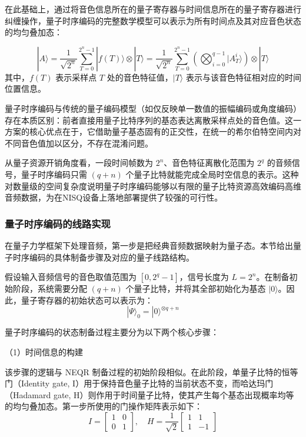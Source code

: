 在此基础上，通过将音色信息所在的量子寄存器与时间信息所在的量子寄存器进行纠缠操作，量子时序编码的完整数学模型可以表示为所有时间点及其对应音色状态的均匀叠加态：

\begin{equation}
    |A\rangle = \frac{1}{\sqrt{2^n}} \sum_{T=0}^{2^n-1} |f(T)\rangle \otimes |T\rangle = \frac{1}{\sqrt{2^n}} \sum_{T=0}^{2^n-1} \left( \bigotimes_{i=0}^{q-1} |A_{T}^{i}\rangle \right) \otimes |T\rangle
    \label{eq:qtse_state}
\end{equation}
其中，$f(T)$ 表示采样点 $T$ 处的音色特征值，$|T\rangle$ 表示与该音色特征相对应的时间位置信息。

量子时序编码与传统的量子编码模型（如仅反映单一数值的振幅编码或角度编码）存在本质区别：前者直接用量子比特序列的基态表达离散采样点处的音色值。这一方案的核心优点在于，它借助量子基态固有的正交性，在统一的希尔伯特空间内对不同音色值加以区分，不存在混淆问题。

从量子资源开销角度看，一段时间帧数为 $2^n$、音色特征离散化范围为 $2^q$ 的音频信号，量子时序编码只需 $(q+n)$ 个量子比特就能完成全局时空信息的表示。这种对数量级的空间复杂度说明量子时序编码能够以有限的量子比特资源高效编码高维音频数据，为在NISQ设备上落地部署提供了较强的可行性。

\subsubsection{量子时序编码的线路实现}
\label{sec:qtse_circuit}

在量子力学框架下处理音频，第一步是把经典音频数据映射为量子态。本节给出量子时序编码的具体制备步骤及对应的量子线路结构。

假设输入音频信号的音色取值范围为 $\left[0, 2^{q} - 1\right]$，信号长度为 $L = 2^n$。在制备初始阶段，系统需要分配 $(q+n)$ 个量子比特，并将其全部初始化为基态 $|0\rangle$。因此，量子寄存器的初始状态可以表示为：
\begin{equation}
	|\Psi\rangle_0=|0\rangle^{\otimes q+n}
	\label{eq:initial_state}
\end{equation}

量子时序编码的状态制备过程主要分为以下两个核心步骤：

（1）时间信息的构建

该步骤的逻辑与 NEQR 制备过程的初始阶段相似。在此阶段，单量子比特的恒等门（Identity gate, I）用于保持音色量子比特的当前状态不变，而哈达玛门（Hadamard gate, H）则作用于时间量子比特，使其产生每个基态出现概率均等的均匀叠加态。第一步所使用的门操作矩阵表示如下：
\begin{equation}
	I=\begin{bmatrix}
		1 & 0 \\
		0 & 1
	\end{bmatrix}, \quad H=\frac{1}{\sqrt{2}}\begin{bmatrix}
		1 & 1 \\
		1 & -1
	\end{bmatrix}
	\label{eq:gates}
\end{equation}

